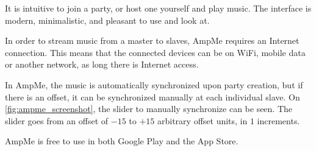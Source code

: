 It is intuitive to join a party, or host one yourself and play music.
The interface is modern, minimalistic, and pleasant to use and look at.

In order to stream music from a master to slaves, AmpMe requires an Internet connection.
This means that the connected devices can be on WiFi, mobile data or another network, as long there is Internet access.

In AmpMe, the music is automatically synchronized upon party creation, but if there is an offset, it can be synchronized manually at each individual slave.
On \cref{fig:ampme_screenshot}, the slider to manually synchronize can be seen.
The slider goes from an offset of $-15$ to $+15$ arbitrary offset units, in $1$ increments.

AmpMe is free to use in both Google Play and the App Store.\cite{amp_faq, amp_play, amp_itunes}

